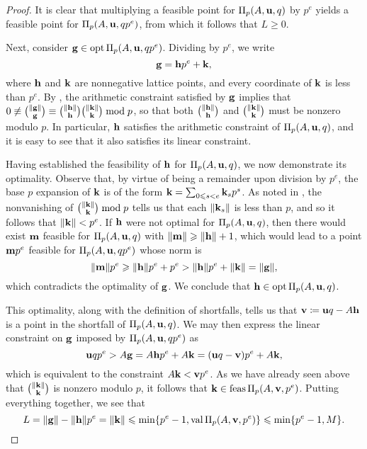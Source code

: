 \documentclass{amsart}
\begin{document}
\begin{proof}
   It is clear that multiplying a feasible point for $\Pi_p(A, \mathbf{u}, q)$ by $p^e$ yields a feasible point for $\Pi_p(A, \mathbf{u}, qp^e)$, from which it follows that $L\geq 0$.


   Next, consider $\mathbf{g} \in \operatorname{opt} \Pi_p(A, \mathbf{u}, qp^e)$.
   Dividing by $p^e$, we write
   \[ \mathbf{g} = \mathbf{h} p^e + \mathbf{k}, \]
   where $\mathbf{h}$ and $\mathbf{k}$ are nonnegative lattice points, and every coordinate of $\mathbf{k}$ is less than $p^e$.
   By , the arithmetic constraint satisfied by $\mathbf{g}$ implies that $0 \not \equiv \binom{\| \mathbf{g} \|}{\mathbf{g}} \equiv \binom{\| \mathbf{h} \|}{\mathbf{h}} \binom{\| \mathbf{k} \|}{\mathbf{k}} \bmod p$, so that both $\binom{\| \mathbf{h} \|}{\mathbf{h}}$ and $\binom{\| \mathbf{k} \|}{\mathbf{k}}$ must be nonzero modulo $p$.
   In particular, $\mathbf{h}$ satisfies the arithmetic constraint of $\Pi_p(A,\mathbf{u},q)$, and it is easy to see that it also satisfies its linear constraint.

   Having established the feasibility of $\mathbf{h}$ for $\Pi_p(A,\mathbf{u},q)$, we now demonstrate its optimality.
   Observe that, by virtue of being a remainder upon division by $p^e$, the base $p$ expansion of $\mathbf{k}$ is of the form $\mathbf{k} = \sum_{0 \leqslant s< e} \mathbf{k}_s  p^s$.
   As noted in , the nonvanishing of $\binom{\| \mathbf{k} \|}{\mathbf{k}} \bmod p$ tells us that each $\| \mathbf{k}_s \|$ is less than $p$, and so it follows that $\| \mathbf{k} \| < p^e$.
   If $\mathbf{h}$ were not optimal for $\Pi_p(A, \mathbf{u}, q)$, then there would exist $\mathbf{m}$ feasible for $\Pi_p(A, \mathbf{u}, q)$ with $\| \mathbf{m} \| \geqslant \| \mathbf{h} \| + 1$, which would lead to a point $\mathbf{m}p^e$ feasible for $\Pi_p(A, \mathbf{u}, qp^e)$ whose norm is
   \[ \| \mathbf{m} \|  p^e \geqslant \| \mathbf{h} \|  p^e + p^e >  \| \mathbf{h} \|  p^e + \| \mathbf{k} \| = \| \mathbf{g} \|,\]
   which contradicts the optimality of $\mathbf{g}$.
   We conclude that $\mathbf{h} \in \operatorname{opt} \Pi_p(A, \mathbf{u},q)$.

   This optimality, along with the definition of shortfalls, tells us that $\mathbf{v} \coloneqq \mathbf{u}q-A\mathbf{h}$ is a point in the shortfall of $\Pi_p(A, \mathbf{u},q)$.
   We may then express the linear constraint on $\mathbf{g}$ imposed by $\Pi_p(A, \mathbf{u}, qp^e)$ as
   \[ \mathbf{u}qp^e > A \mathbf{g} = A \mathbf{h} p^e + A \mathbf{k} = (\mathbf{u}q-\mathbf{v})p^e + A \mathbf{k}, \]
   which is equivalent to the constraint $A \mathbf{k} < \mathbf{v}p^e$.
   As we have already seen above that $\binom{\| \mathbf{k} \|}{\mathbf{k}}$ is nonzero modulo $p$, it follows that $\mathbf{k} \in \operatorname{feas} \Pi_p(A, \mathbf{v}, p^e)$.
   Putting everything together, we see that
   \[ L = \| \mathbf{g} \|-\| \mathbf{h} \|p^e = \| \mathbf{k} \| \leqslant \min \{ p^e-1, \operatorname{val} \Pi_p(A, \mathbf{v}, p^e) \} \leqslant \min \{ p^e-1, M \}.\]


\end{proof}
\end{document}
